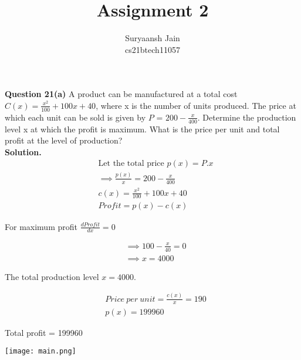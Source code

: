\documentclass[journal,12pt,twocolumn]{IEEEtran}
\title{Assignment 2 \\}
\author{Suryaansh Jain \\ \normalsize cs21btech11057 \\}
\begin{document}
	\maketitle
	
	\textbf{Question 21(a)} 
	A product can be manufactured at a total cost $C(x) = \frac{x^{2}}{100}+100x+40$, where x
is the number of units produced. The price at which each unit can be sold is given
by $P$ = $200 - \frac{x}{400}$. Determine the production level x at which the profit is
maximum. What is the price per unit and total profit at the level of production? \\
	
	
	\textbf{Solution.}		
	\begin{align}
	    &\text{Let\ the\ total\ price\ }p(x) = P.x \\
		&\implies \frac{p(x)}{x} = 200 - \frac{x}{400} \\
		&c(x) = \frac{x^{2}}{100} + 100x + 40 \\
		&Profit = p(x) - c(x)
	\end{align}
	
	For maximum profit $\frac{dProfit}{dx} = 0$
	
	\begin{align}
	    &\implies 100 - \frac{x}{40} = 0 \\
	    &\implies x = 4000
	\end{align}
	
	The total production level $x = 4000$.
	
	\begin{align}
        &Price\ per\ unit =  \frac{c(x)}{x}  = 190 \\
        &p(x)= 199960
	\end{align}
	
	Total profit = 199960
			
	
	\texttt{[image: main.png]}
	
\end{document}
